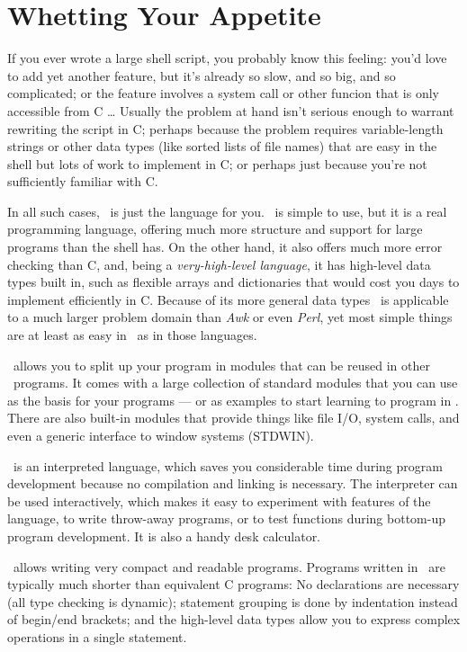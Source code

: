 \pagebreak


\section{Whetting Your Appetite}

If you ever wrote a large shell script, you probably know this feeling:
you'd love to add yet another feature, but it's already so slow, and so
big, and so complicated; or the feature involves a system call or other
funcion that is only accessible from C \ldots
Usually the problem at hand isn't serious enough to warrant rewriting
the script in C; perhaps because the problem requires variable-length
strings or other data types (like sorted lists of file names) that
are easy in the shell but lots of work to implement in C; or perhaps
just because you're not sufficiently familiar with C.

In all such cases, \Python\ is just the language for you.
\Python\ is simple to use, but it is a real programming language, offering
much more structure and support for large programs than the shell has.
On the other hand, it also offers much more error checking than C, and,
being a
{\em very-high-level language},
it has high-level data types built in, such as flexible arrays and
dictionaries that would cost you days to implement efficiently in C.
Because of its more general data types \Python\ is applicable to a
much larger problem domain than
{\em Awk}
or even
{\em Perl},
yet most simple things are at least as easy in \Python\ as in those
languages.

\Python\ allows you to split up your program in modules that can be reused
in other \Python\ programs.
It comes with a large collection of standard modules that you can use as
the basis for your programs --- or as examples to start learning to
program in \Python.
There are also built-in modules that provide things like file I/O,
system calls, and even a generic interface to window systems (STDWIN).

\Python\ is an interpreted language, which saves you considerable time
during program development because no compilation and linking is
necessary.
The interpreter can be used interactively, which makes it easy to
experiment with features of the language, to write throw-away programs,
or to test functions during bottom-up program development.
It is also a handy desk calculator.

\Python\ allows writing very compact and readable programs.
Programs written in \Python\ are typically much shorter than equivalent C
programs:
No declarations are necessary (all type checking is
dynamic); statement grouping is done by indentation instead of begin/end
brackets; and the high-level data types allow you to express complex
operations in a single statement.

